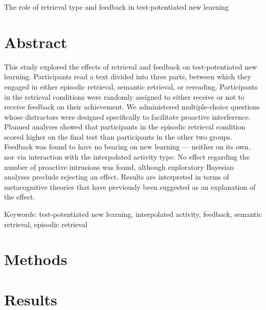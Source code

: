 \documentclass[12pt]{article}
\newcommand\specialsection{%
    \titleformat{\section}{\centering\normalsize\rmfamily}{}{0pt}{}
}
\newcommand\regularsection{%
    \titleformat{\section}{\centering\normalsize\rmfamily\bfseries}{}{0pt}{}
}
\def\biblio{}
\begin{document}
\def\biblio{}

\specialsection


{\centering
	The role of retrieval type and feedback in 
	test-potentiated new learning\par}


\section{Abstract}

This study explored the effects of retrieval and feedback 
on test-potentiated new learning. Participants read a text 
divided into three parts, between which they engaged in 
either episodic retrieval, semantic retrieval, or 
rereading. Participants in the retrieval conditions were 
randomly assigned to either receive or not to receive 
feedback on their achievement. We administered 
multiple-choice questions whose distractors were designed 
specifically to facilitate proactive interference. Planned 
analyses showed that participants in the episodic retrieval 
condition scored higher on the final test than participants 
in the other two groups. Feedback was found to have no 
bearing on new learning --- neither on its own, nor via 
interaction with the interpolated activity type. No effect 
regarding the number of proactive intrusions was found, 
although exploratory Bayesian analyses preclude rejecting 
an effect. Results are interpreted in terms of 
metacognitive theories that have previously been suggested 
as an explanation of the effect.

\bigskip

\noindent Keywords: test-potentiated new learning, interpolated activity, 
feedback, semantic retrieval, episodic retrieval

\newpage

\hypertarget{introduction}{%
}



\regularsection

\hypertarget{methods}{%
\section{Methods}}



\hypertarget{results}{%
\section{Results}}
\end{document}
